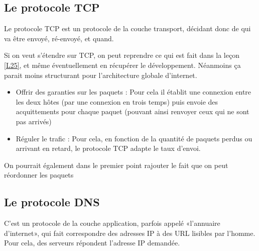 \subsection{Le protocole TCP}

Le protocole TCP est un protocole de la couche transport, décidant donc de qui va être envoyé, ré-envoyé, et quand.

\begin{com}
	Si on veut s'étendre sur TCP, on peut reprendre ce qui est fait dans la leçon \ref{L25}, et même éventuellement en récupérer le développement. Néanmoins ça parait moins structurant pour l'architecture globale d'internet.
\end{com}

\begin{principe}
	\begin{itemize}
		\item Offrir des garanties sur les paquets : Pour cela il établit une connexion entre les deux hôtes (par une connexion en trois temps) puis envoie des acquittements pour chaque paquet (pouvant ainsi renvoyer ceux qui ne sont pas arrivés)
		
		\item Réguler le trafic : Pour cela, en fonction de la quantité de paquets perdus ou arrivant en retard, le protocole TCP adapte le taux d'envoi.
	\end{itemize}
\end{principe}

\begin{com}
	On pourrait également dans le premier point rajouter le fait que on peut réordonner les paquets
\end{com}

\subsection{Le protocole DNS}

C'est un protocole de la couche application, parfois appelé «l'annuaire d'internet», qui fait correspondre des adresses IP à des URL lisibles par l'homme. Pour cela, des serveurs répondent l'adresse IP demandée.\\

